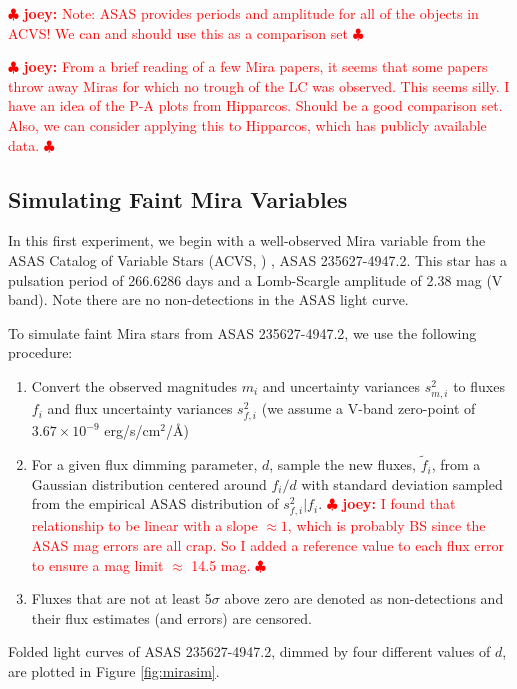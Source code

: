 \documentclass[12pt,preprint]{aastex}
\newcommand{\joey}[1] { \textcolor{red} {
\ensuremath{\clubsuit} {\bf joey:}  {#1}
\ensuremath{\clubsuit} } }%
\begin{document}
\joey{Note: ASAS provides periods and amplitude for all of the objects in ACVS!  We can and should use this as a comparison set}

\joey{From a brief reading of a few Mira papers, it seems that some papers throw away Miras for which no trough of the LC was observed.  This seems silly.  I have an idea of the P-A plots from Hipparcos.  Should be a good comparison set.  Also, we can consider applying this to Hipparcos, which has publicly available data.}

\subsection{Simulating Faint Mira Variables}
\label{ss:mirasim}

In this first experiment, we begin with a well-observed Mira variable from the ASAS Catalog of Variable Stars (ACVS, \citealt{acvs}) , ASAS 235627-4947.2.  This star has a pulsation period of 266.6286 days and a Lomb-Scargle amplitude of 2.38 mag (V band).  Note there are no non-detections in the ASAS light curve.

To simulate faint Mira stars from ASAS 235627-4947.2, we use the following procedure:
\begin{enumerate}
\item Convert the observed magnitudes $m_i$ and uncertainty variances $s^2_{m,i}$ to fluxes $f_i$ and flux uncertainty variances $s^2_{f,i}$ (we assume a V-band zero-point of $3.67\times10^{-9}$ erg/s/cm$^2$/\AA)
\item For a given flux dimming parameter, $d$, sample the new fluxes, $\tilde{f}_i$, from a Gaussian distribution centered around $f_i / d$ with standard deviation sampled from the empirical ASAS distribution of $s^2_{f,i} | f_i$. \joey{I found that relationship to be linear with a slope $\approx 1$, which is probably BS since the ASAS mag errors are all crap.  So I added a reference value to each flux error to ensure a mag limit $\approx$ 14.5 mag.}
\item Fluxes that are not at least 5$\sigma$ above zero are denoted as non-detections and their flux estimates (and errors) are censored.
\end{enumerate}
Folded light curves of ASAS 235627-4947.2, dimmed by four different values of $d$, are plotted in Figure \ref{fig:mirasim}.
\end{document}

